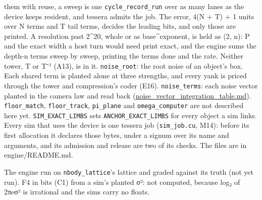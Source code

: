 \begin{description}
them with reuse, a sweep is one \texttt{cycle\_\allowbreak{}record\_\allowbreak{}run} over as many lanes as the device keeps resident, and tessera admits the job. The error, 4(N + T) + 1 units over N terms and T tail terms, decides the leading bits, and only those are printed. A resolution past 2\textasciicircum{}20, whole or as base\textasciicircum{}exponent, is held as (2, n): P and the exact width a host turn would need print exact, and the engine sums the depth-n terms sweep by sweep, printing the terms done and the rate. Neither tower, T or T⁻¹ (A13), is in it. \texttt{noise\_\allowbreak{}root}: the root noise of an object's box. Each shared term is planted alone at three strengths, and every yank is priced through the tower and compression's coder (E16). \texttt{noise\_\allowbreak{}terms}: each noise vector planted in the camera law and read back (\hyperref[chap:noise-vector-integration-table]{noise\_\allowbreak{}vector\_\allowbreak{}integration\_\allowbreak{}table.md}). \texttt{floor\_\allowbreak{}match}, \texttt{floor\_\allowbreak{}track}, \texttt{pi\_\allowbreak{}plane} and \texttt{omega\_\allowbreak{}computer} are not described here yet. \texttt{SIM\_\allowbreak{}EXACT\_\allowbreak{}LIMBS} sets \texttt{ANCHOR\_\allowbreak{}EXACT\_\allowbreak{}LIMBS} for every object a sim links. Every sim that uses the device is one tessera job (\texttt{sim\_\allowbreak{}job.\allowbreak{}cu}, M14): before its first allocation it declares those bytes, under a signum over its name and arguments, and its admission and release are two of its checks. The files are in engine/README.md.
\item[{wants}] The engine run on \texttt{nbody\_\allowbreak{}lattice}'s lattice and graded against its truth (not yet run). F4 in bits (C1) from a sim's planted σ²: not computed, because log₂ of 2πeσ² is irrational and the sims carry no floats.

\end{description}
